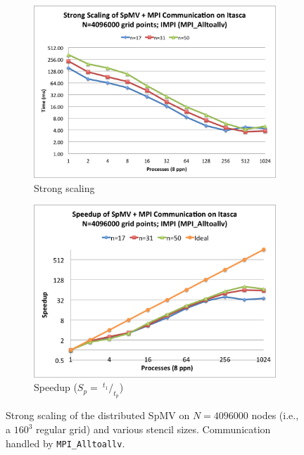 \documentclass{report}
\begin{document}
\begin{figure} 
\centering
\begin{subfigure}{0.48\textwidth}
\centering
\includegraphics[width=\textwidth]{performance_content/scaling/strong_scaling_4M_regular_alltoallv.png}  
\caption{Strong scaling}
\label{fig:strong_scaling_alltoallv_all_stencils}
\end{subfigure}
\begin{subfigure}{0.48\textwidth}
\centering
\includegraphics[width=\textwidth]{performance_content/scaling/strong_scaling_4M_regular_alltoallv_speedup.png}
\caption{Speedup ($S_p = \ ^{t_{1}}/_{t_p}$)}
\label{fig:strong_scaling_speedup_alltoallv_all_stencils}
\end{subfigure}
\caption{Strong scaling of the distributed SpMV on $N=4096000$ nodes (i.e., a $160^3$ regular grid) and various stencil sizes. Communication handled by \texttt{MPI\_Alltoallv}. }
\label{fig:strong_scaling_alltoallv}
\end{figure}
\end{document}
